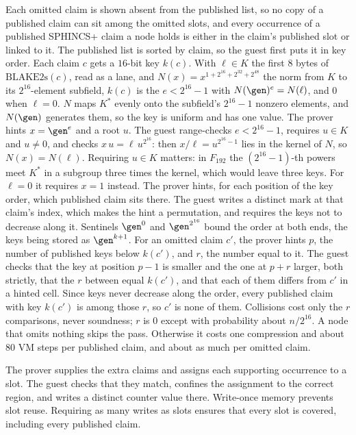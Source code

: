 Each omitted claim is shown absent from the published list, so no copy of a published claim can sit among the omitted slots, and every occurrence of a published SPHINCS+ claim a node holds is either in the claim's published slot or linked to it. The published list is sorted by claim, so the guest first puts it in key order. Each claim $c$ gets a $16$-bit key $k(c)$. With $\ell \in K$ the first $8$ bytes of $\text{BLAKE2s}(c)$, read as a lane, and $N(x) = x^{1+2^{16}+2^{32}+2^{48}}$ the norm from $K$ to its $2^{16}$-element subfield, $k(c)$ is the $e < 2^{16}-1$ with $N(\gen)^e = N(\ell)$, and $0$ when $\ell = 0$. $N$ maps $K^*$ evenly onto the subfield's $2^{16}-1$ nonzero elements, and $N(\gen)$ generates them, so the key is uniform and has one value. The prover hints $x = \gen^e$ and a root $u$. The guest range-checks $e < 2^{16}-1$, requires $u \in K$ and $u \ne 0$, and checks $x\,u = \ell\,u^{2^{16}}$: then $x/\ell = u^{2^{16}-1}$ lies in the kernel of $N$, so $N(x) = N(\ell)$. Requiring $u \in K$ matters: in $F_{192}$ the $(2^{16}-1)$-th powers meet $K^*$ in a subgroup three times the kernel, which would leave three keys. For $\ell = 0$ it requires $x = 1$ instead. The prover hints, for each position of the key order, which published claim sits there. The guest writes a distinct mark at that claim's index, which makes the hint a permutation, and requires the keys not to decrease along it. Sentinels $\gen^0$ and $\gen^{2^{16}}$ bound the order at both ends, the keys being stored as $\gen^{k+1}$. For an omitted claim $c'$, the prover hints $p$, the number of published keys below $k(c')$, and $r$, the number equal to it. The guest checks that the key at position $p-1$ is smaller and the one at $p+r$ larger, both strictly, that the $r$ between equal $k(c')$, and that each of them differs from $c'$ in a hinted cell. Since keys never decrease along the order, every published claim with key $k(c')$ is among those $r$, so $c'$ is none of them. Collisions cost only the $r$ comparisons, never soundness; $r$ is $0$ except with probability about $n/2^{16}$. A node that omits nothing skips the pass. Otherwise it costs one compression and about $80$ VM steps per published claim, and about as much per omitted claim.

The prover supplies the extra claims and assigns each supporting occurrence to a slot. The guest checks that they match, confines the assignment to the correct region, and writes a distinct counter value there. Write-once memory prevents slot reuse. Requiring as many writes as slots ensures that every slot is covered, including every published claim.


